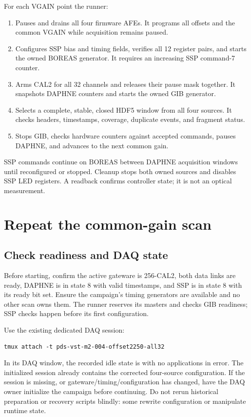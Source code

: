 \documentclass[10pt,a4paper]{article}
\newcommand{\code}[1]{\texttt{\detokenize{#1}}}
\begin{document}
For each VGAIN point the runner:
\begin{enumerate}
\item Pauses and drains all four firmware AFEs. It programs all offsets and the common VGAIN while acquisition remains paused.
\item Configures SSP bias and timing fields, verifies all 12 register pairs, and starts the owned BOREAS generator. It requires an increasing SSP command-7 counter.
\item Arms CAL2 for all 32 channels and releases their pause mask together. It snapshots DAPHNE counters and starts the owned GIB generator.
\item Selects a complete, stable, closed HDF5 window from all four sources. It checks headers, timestamps, coverage, duplicate events, and fragment status.
\item Stops GIB, checks hardware counters against accepted commands, pauses DAPHNE, and advances to the next common gain.
\end{enumerate}
SSP commands continue on BOREAS between DAPHNE acquisition windows until reconfigured or stopped. Cleanup stops both owned sources and disables SSP LED registers. A readback confirms controller state; it is not an optical measurement.

\section{Repeat the common-gain scan}
\subsection{Check readiness and DAQ state}
Before starting, confirm the active gateware is 256-CAL2, both data links are ready, DAPHNE is in state 8 with valid timestamps, and SSP is in state 8 with its ready bit set. Ensure the campaign's timing generators are available and no other scan owns them. The runner reserves its masters and checks GIB readiness; SSP checks happen before its first configuration.

Use the existing dedicated DAQ session:
\begin{lstlisting}
tmux attach -t pds-vst-m2-004-offset2250-all32
\end{lstlisting}
In its DAQ window, the recorded idle state is \code{configured} with no applications in error. The initialized session already contains the corrected four-source configuration. If the session is missing, or gateware/timing/configuration has changed, have the DAQ owner initialize the campaign before continuing. Do not rerun historical preparation or recovery scripts blindly: some rewrite configuration or manipulate runtime state.
\end{document}
